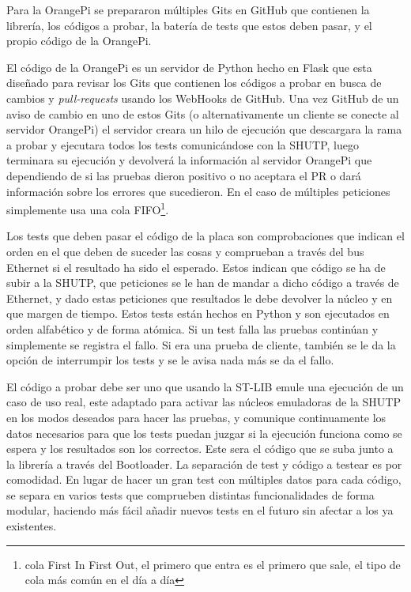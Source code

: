 \documentclass{report}
\begin{document}
Para la OrangePi se prepararon múltiples Gits en GitHub que contienen la librería, los códigos a probar, la batería de tests que estos deben pasar, y el propio código de la OrangePi. \par
El código de la OrangePi es un servidor de Python hecho en Flask que esta diseñado para revisar los Gits que contienen los códigos a probar en busca de cambios y \textit{pull-requests} usando los WebHooks de GitHub. Una vez GitHub de un aviso de cambio en uno de estos Gits (o alternativamente un cliente se conecte al servidor OrangePi) el servidor creara un hilo de ejecución que descargara la rama a probar y ejecutara todos los tests comunicándose con la SHUTP, luego terminara su ejecución y devolverá la información al servidor OrangePi que dependiendo de si las pruebas dieron positivo o no aceptara el PR o dará información sobre los errores que sucedieron. En el caso de múltiples peticiones simplemente usa una cola FIFO\footnote{cola First In First Out, el primero que entra es el primero que sale, el tipo de cola más común en el día a día}. \par \vspace{0.3cm}
Los tests que deben pasar el código de la placa son comprobaciones que indican el orden en el que deben de suceder las cosas y comprueban a través del bus Ethernet si el resultado ha sido el esperado. Estos indican que código se ha de subir a la SHUTP, que peticiones se le han de mandar a dicho código a través de Ethernet, y dado estas peticiones que resultados le debe devolver la núcleo y en que margen de tiempo. Estos tests están hechos en Python y son ejecutados en orden alfabético y de forma atómica. Si un test falla las pruebas continúan y simplemente se registra el fallo. Si era una prueba de cliente, también se le da la opción de interrumpir los tests y se le avisa nada más se da el fallo. \par
El código a probar debe ser uno que usando la ST-LIB emule una ejecución de un caso de uso real, este adaptado para activar las núcleos emuladoras de la SHUTP en los modos deseados para hacer las pruebas, y comunique continuamente los datos necesarios para que los tests puedan juzgar si la ejecución funciona como se espera y los resultados son los correctos. Este sera el código que se suba junto a la librería a través del Bootloader. La separación de test y código a testear es por comodidad. En lugar de hacer un gran test con múltiples datos para cada código, se separa en varios tests que comprueben distintas funcionalidades de forma modular, haciendo más fácil añadir nuevos tests en el futuro sin afectar a los ya existentes.
\end{document}
